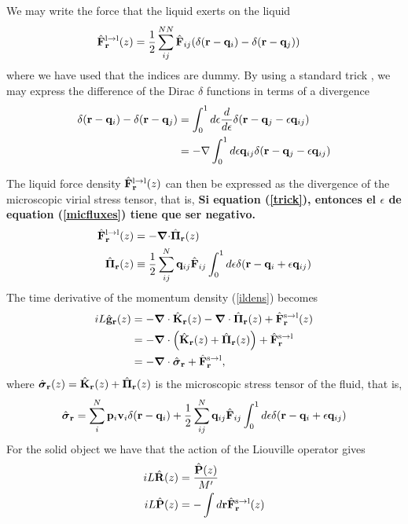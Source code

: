 \documentclass[b5paper,openright,10pt]{book}
\newcommand{\Note}[1]{{\bf \color{red}#1}}    %
\begin{document}
We may write the force that the liquid exerts on the liquid 
\begin{align}
  \hat{\bf F}^{\rm l\to l}_{\bf r}(z) &= \frac{1}{2}\sum^{NN}_{ij}\hat{\bf F}_{ij}
(\delta({\bf r}-{\bf q}_i)-\delta({\bf r}-{\bf q}_j))
\end{align}
where we  have used that  the indices are  dummy. By using  a standard
trick \cite{Schofield1982,Grabert1982}, we  may express the difference
of the Dirac $\delta$ functions in terms of a divergence
\begin{align}
\delta({\bf r}-{\bf q}_i)-\delta({\bf r}-{\bf q}_j)
    &=\int_0^1d\epsilon\frac{d}{d\epsilon}
\delta({\bf r}-{\bf q}_j-\epsilon{\bf q}_{ij})
\nonumber\\
    &=-\nabla\int_0^1d\epsilon{\bf q}_{ij}
\delta({\bf r}-{\bf q}_j-\epsilon{\bf q}_{ij})
\nonumber\\
\label{trick}
\end{align}

The liquid  force density  $\hat{\bf F}^{\rm  l\to l}_{\bf  r}(z)$ can
then be expressed  as the divergence of the  microscopic virial stress
tensor, that is,
\Note{Si equation (\ref{trick}), entonces el $\epsilon$ de equation (\ref{micfluxes}) tiene que ser negativo.}
\begin{align}
\hat{\bf F}^{\rm l\to l}_{\bf r}(z)&=-\boldsymbol{\nabla}{\cdot} \hat{\boldsymbol{\Pi}}_{\bf r}(z)
\nonumber\\
\hat{\boldsymbol{\Pi}}_{\bf r}(z)&\equiv \frac{1}{2}\sum^{N}_{ij}{\bf q}_{ij}\hat{\bf F}_{ij}
\int_0^{1}d\epsilon \delta({\bf r}-{\bf q}_i+\epsilon{\bf q}_{ij})
\label{micfluxes}
\end{align}
The time derivative of the momentum density (\ref{ildens}) becomes
\begin{align}
    iL\hat{\bf g}_{\bf r}(z)
    &=-\boldsymbol{\nabla}\cdot \hat{{\bf K}}_{\bf r}(z) - \boldsymbol{\nabla}\cdot \hat{{\bf     \Pi}}_{\bf r}(z) +  \hat{{\bf F}}^{\rm s\to l}_{\bf r}(z) \nonumber \\
    &= -\boldsymbol{\nabla}\cdot\left(\hat{{\bf K}}_{\bf r}(z)+\hat{{\bf \Pi}}_{\bf r}(z)\right) +\hat{{\bf F}}^{\rm s\to l}_{\bf r} \nonumber \\
    &=-\boldsymbol{\nabla}\cdot \hat{\boldsymbol{\sigma}}_{\bf r}+\hat{{\bf F}}^{\rm s\to l}_{\bf r},
\label{gls}
\end{align}
where     $\hat{\boldsymbol{\sigma}}_{\bf r}(z)=\hat{{\bf K}}_{\bf
r}(z)+\hat{\boldsymbol{\Pi}}_{\bf r}(z)$  is the microscopic stress
tensor of the fluid, that is,
\begin{align}
  \hat{\boldsymbol{\sigma}}_{\bf r}=
\sum^{N}_i{\bf p}_i{\bf v}_i
\delta({\bf r}-{\bf q}_i)
+
\frac{1}{2}\sum^{N}_{ij}{\bf q}_{ij}\hat{\bf F}_{ij}
\int_0^{1}d\epsilon \delta({\bf r}-{\bf q}_i+\epsilon{\bf q}_{ij})
\label{sigma}
\end{align}
For the solid object we have that the action of the Liouville operator gives
\begin{align}
    iL\hat{\bf R}(z) &=\frac{\hat{\bf P}(z)}{M'}
  \nonumber\\
    iL\hat{\bf P}(z) &=-\int  d{\bf r} \hat{\bf F}^{\rm s\to l}_{\bf r}(z)
   \label{Pfsl}  
\end{align} 
\end{document}
